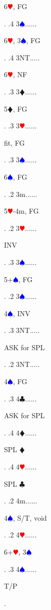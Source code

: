 \documentclass[a4paper]{article}
\newcommand{\BC}{\textcolor{OliveGreen}{$\clubsuit$}}
\newcommand{\BD}{\textcolor{RedOrange}{$\vardiamondsuit$}}
\newcommand{\BH}{\textcolor{Red}{$\varheartsuit${}}}
\newcommand{\BS}{\textcolor{Blue}{$\spadesuit${}}}
\begin{document}
{\begin{minipage}[t]{0.8\textwidth}
6\BH , FG
\end{minipage}. 
 .4 3\BS......\begin{minipage}[t]{0.8\textwidth}
6\BH , 3\BS , FG
\end{minipage}. 
 .4 3NT.....\begin{minipage}[t]{0.8\textwidth}
6\BH , NF
\end{minipage}. 
 .3 3\BD......\begin{minipage}[t]{0.8\textwidth}
5\BD , FG
\end{minipage}. 
 .3 3\BH......\begin{minipage}[t]{0.8\textwidth}
fit, FG
\end{minipage}. 
 .3 3\BS......\begin{minipage}[t]{0.8\textwidth}
6\BS , FG
\end{minipage}. 
 .2 3m......\begin{minipage}[t]{0.8\textwidth}
5\BH -4m, FG
\end{minipage}. 
 .2 3\BH......\begin{minipage}[t]{0.8\textwidth}
INV
\end{minipage}. 
 .3 3\BS......\begin{minipage}[t]{0.8\textwidth}
5+\BS , FG
\end{minipage}. 
 .2 3\BS......\begin{minipage}[t]{0.8\textwidth}
4\BS , INV
\end{minipage}. 
 .3 3NT.....\begin{minipage}[t]{0.8\textwidth}
ASK for SPL
\end{minipage}. 
 .2 3NT.....\begin{minipage}[t]{0.8\textwidth}
4\BS , FG
\end{minipage}. 
 .3 4\BC......\begin{minipage}[t]{0.8\textwidth}
ASK for SPL
\end{minipage}. 
 .4 4\BD......\begin{minipage}[t]{0.8\textwidth}
SPL \BD 
\end{minipage}. 
 .4 4\BH......\begin{minipage}[t]{0.8\textwidth}
SPL \BC 
\end{minipage}. 
 .2 4m......\begin{minipage}[t]{0.8\textwidth}
4\BS , S/T, void
\end{minipage}. 
 .2 4\BH......\begin{minipage}[t]{0.8\textwidth}
6+\BH , 3\BS 
\end{minipage}. 
 .3 4\BS......\begin{minipage}[t]{0.8\textwidth}
T/P
\end{minipage}. 
}
\bigbreak
\end{document}
